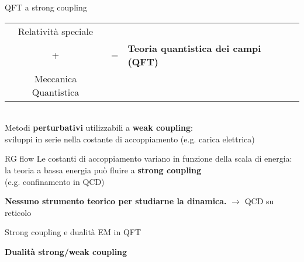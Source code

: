 \documentclass[10pt,compress,usenames,dvipsnames]{beamer}
\begin{document}
\begin{frame}{QFT a strong coupling}
\begin{tabular}{c l l }
Relatività speciale  & \\[0,1cm]
{\Large +} & {\Large=}  & \alert{ \bfseries \large Teoria quantistica dei campi (QFT) }\\
Meccanica Quantistica & \\
\end{tabular}
\\
\vspace{0.3cm}
Metodi {\bfseries perturbativi} utilizzabili a \alert{\bfseries weak coupling}: \\
sviluppi in serie nella costante di accoppiamento (\small e.g.\alert { carica elettrica}) \\

\begin{block}{RG flow}
Le costanti di accoppiamento variano in funzione della scala di energia:	\\
la teoria a bassa energia può fluire a \alert{ \bfseries strong coupling} \\
(e.g. confinamento in QCD)
\end{block}

\alert{\bfseries Nessuno strumento teorico per studiarne la dinamica.}
$\longrightarrow$ QCD su reticolo

\end{frame}



\begin{frame}{Strong coupling e dualità EM in QFT}
\begin{center}
 \alert{\bfseries \Large Dualità strong/weak coupling}
\end{center}

\end{frame}
\end{document}
